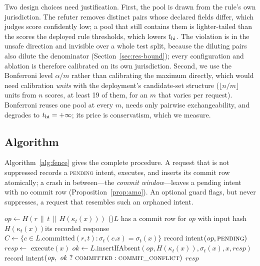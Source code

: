 Two design choices need justification. First, the pool is drawn from the rule's own jurisdiction. The refuter removes distinct pairs whose declared fields differ, which judges score confidently low; a pool that still contains them is lighter-tailed than the scores the deployed rule thresholds, which lowers $t_{\mathrm{hi}}$. The violation is in the unsafe direction and invisible over a whole test split, because the diluting pairs also dilute the denominator (Section~\ref{sec:res-bound}); every configuration and ablation is therefore calibrated on its own jurisdiction. Second, we use the Bonferroni level $\alpha/m$ rather than calibrating the maximum directly, which would need calibration \emph{units} with the deployment's candidate-set structure ($\lfloor n/m\rfloor$ units from $n$ scores, at least 19 of them, for an $m$ that varies per request). Bonferroni reuses one pool at every $m$, needs only pairwise exchangeability, and degrades to $t_{\mathrm{hi}}=+\infty$; its price is conservatism, which we measure.

\subsection{Algorithm}

Algorithm~\ref{alg:fence} gives the complete procedure. A request that is not suppressed records a \textsc{pending} intent, executes, and inserts its commit row atomically; a crash in between---the \emph{commit window}---leaves a pending intent with no commit row (Proposition~\ref{prop:amo}). An optional guard flags, but never suppresses, a request that resembles such an orphaned intent.

\begin{algorithm}[!tbp]
\caption{Layered semantic fence (the proposed configuration).}\label{alg:fence}
\scriptsize
{}
$\mathit{op}\gets H(r\,\|\,t\,\|\,H(\kappa_t(x)))$\;
\If(){$L$ has a commit row for $\mathit{op}$ with input hash $H(\kappa_t(x))$}{\Return its recorded response}
$C\gets\{c\in L.\mathrm{committed}(r,t) : \sigma_t(c.x)=\sigma_t(x)\}$
record intent$(\mathit{op},\textsc{pending})$\;
$\mathit{resp}\gets$ execute$(x)$ 
$\mathit{ok}\gets L.$insertIfAbsent$(\mathit{op},H(\kappa_t(x)),\sigma_t(x),x,\mathit{resp})$ 
record intent$(\mathit{op},\ \mathit{ok}\ ?\ \textsc{committed} : \textsc{commit\_conflict})$\;
\Return $\mathit{resp}$\;
\end{algorithm}

